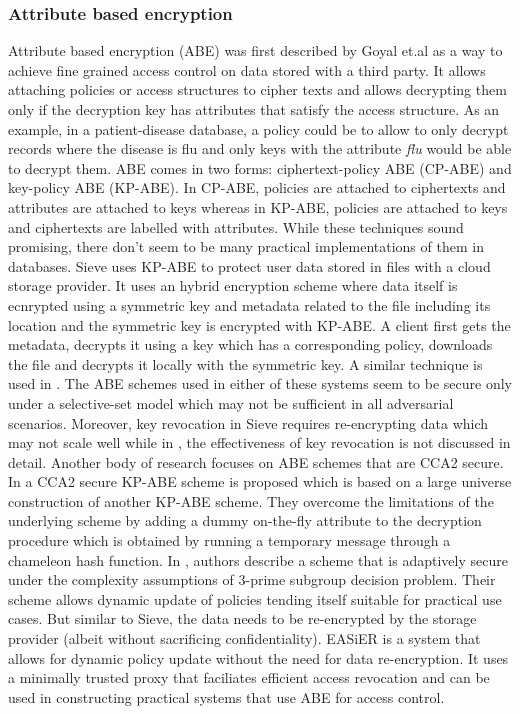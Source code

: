 \subsubsection{Attribute based encryption}
Attribute based encryption (\textsf{ABE}) \cite{abe} was first described by Goyal et.al as a way to achieve fine grained access control on data stored with a third party. It allows attaching policies or access structures to cipher texts and allows decrypting them only if the decryption key has attributes that satisfy the access structure. As an example, in a patient-disease database, a policy could be to allow to only decrypt records where the disease is flu and only keys with the attribute \textit{flu} would be able to decrypt them. \textsf{ABE} comes in two forms: ciphertext-policy ABE (\textsf{CP-ABE}) and key-policy ABE (\textsf{KP-ABE}). In \textsf{CP-ABE}, policies are attached to ciphertexts and attributes are attached to keys whereas in \textsf{KP-ABE}, policies are attached to keys and ciphertexts are labelled with attributes. While these techniques sound promising, there don't seem to be many practical implementations of them in databases. Sieve \cite{sieve} uses \textsf{KP-ABE} to protect user data stored in files with a cloud storage provider. It uses an hybrid encryption scheme where data itself is ecnrypted using a symmetric key and metadata related to the file including its location and the symmetric key is encrypted with \textsf{KP-ABE}. A client first gets the metadata, decrypts it using a key which has a corresponding policy, downloads the file and decrypts it locally with the symmetric key. A similar technique is used in \cite{PPEHR}. The \textsf{ABE} schemes used in either of these systems seem to be secure only under a \textsf{selective-set} model which  may not be sufficient in all adversarial scenarios. Moreover, key revocation in Sieve requires re-encrypting data which may not scale well while in \cite{PPEHR}, the effectiveness of key revocation is not discussed in detail.
\newline\newline
Another body of research focuses on \textsf{ABE} schemes that are \textsf{CCA2} secure. In \cite{cca2_abe1} a \textsf{CCA2} secure \textsf{KP-ABE} scheme is proposed which is based on a \textsf{large universe} construction of another \textsf{KP-ABE} scheme. They overcome the limitations of the underlying scheme by adding a dummy on-the-fly attribute to the decryption procedure which is obtained by running a temporary message through a \textsf{chameleon hash} function. In \cite{cca2_abe2}, authors describe a scheme that is adaptively secure under the complexity assumptions of 3-prime subgroup decision problem. Their scheme allows dynamic update of policies tending itself suitable for practical use cases. But similar to Sieve, the data needs to be re-encrypted by the storage provider (albeit without sacrificing confidentiality). EASiER \cite{easier} is a system that allows for dynamic policy update without the need for data re-encryption. It uses a minimally trusted proxy that faciliates efficient access revocation and can be used in constructing practical systems that use \textsf{ABE} for access control.
